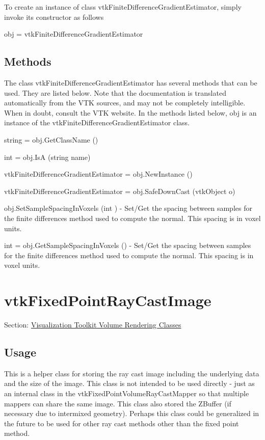 To create an instance of class vtk\-Finite\-Difference\-Gradient\-Estimator, simply invoke its constructor as follows \begin{DoxyVerb}  obj = vtkFiniteDifferenceGradientEstimator
\end{DoxyVerb}
 \hypertarget{vtkwidgets_vtkxyplotwidget_Methods}{}\subsection{Methods}\label{vtkwidgets_vtkxyplotwidget_Methods}
The class vtk\-Finite\-Difference\-Gradient\-Estimator has several methods that can be used. They are listed below. Note that the documentation is translated automatically from the V\-T\-K sources, and may not be completely intelligible. When in doubt, consult the V\-T\-K website. In the methods listed below, {\ttfamily obj} is an instance of the vtk\-Finite\-Difference\-Gradient\-Estimator class. 
\begin{DoxyItemize}
\item {\ttfamily string = obj.\-Get\-Class\-Name ()}  
\item {\ttfamily int = obj.\-Is\-A (string name)}  
\item {\ttfamily vtk\-Finite\-Difference\-Gradient\-Estimator = obj.\-New\-Instance ()}  
\item {\ttfamily vtk\-Finite\-Difference\-Gradient\-Estimator = obj.\-Safe\-Down\-Cast (vtk\-Object o)}  
\item {\ttfamily obj.\-Set\-Sample\-Spacing\-In\-Voxels (int )} -\/ Set/\-Get the spacing between samples for the finite differences method used to compute the normal. This spacing is in voxel units.  
\item {\ttfamily int = obj.\-Get\-Sample\-Spacing\-In\-Voxels ()} -\/ Set/\-Get the spacing between samples for the finite differences method used to compute the normal. This spacing is in voxel units.  
\end{DoxyItemize}\hypertarget{vtkvolumerendering_vtkfixedpointraycastimage}{}\section{vtk\-Fixed\-Point\-Ray\-Cast\-Image}\label{vtkvolumerendering_vtkfixedpointraycastimage}
Section\-: \hyperlink{sec_vtkvolumerendering}{Visualization Toolkit Volume Rendering Classes} \hypertarget{vtkwidgets_vtkxyplotwidget_Usage}{}\subsection{Usage}\label{vtkwidgets_vtkxyplotwidget_Usage}
This is a helper class for storing the ray cast image including the underlying data and the size of the image. This class is not intended to be used directly -\/ just as an internal class in the vtk\-Fixed\-Point\-Volume\-Ray\-Cast\-Mapper so that multiple mappers can share the same image. This class also stored the Z\-Buffer (if necessary due to intermixed geometry). Perhaps this class could be generalized in the future to be used for other ray cast methods other than the fixed point method.

